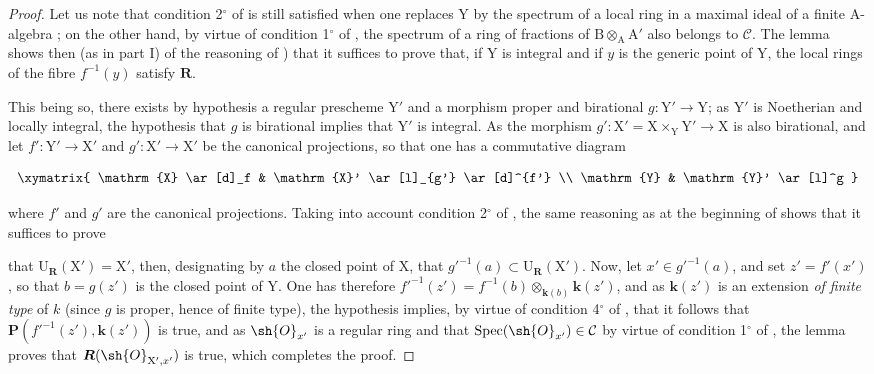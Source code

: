 \begin{proof}
Let us note that condition 2${}^\circ$ of  is still satisfied when one replaces $\mathrm{Y}$ by the spectrum of a local ring in a maximal ideal of a finite $\mathrm{A}$-algebra ; on the other hand, by virtue of condition 1${}^\circ$ of , the spectrum of a ring of fractions of $\mathrm{B}\otimes_\mathrm{A}\mathrm{A}'$ also belongs to $\mathcal{C}$. The lemma  shows then (as in part I) of the reasoning of ) that it suffices to prove that, if $\mathrm{Y}$ is integral and if $y$ is the generic point of $\mathrm{Y}$, the local rings of the fibre $f^{-1}(y)$ satisfy $\boldsymbol{R}$.

This being so, there exists by hypothesis a regular prescheme $\mathrm{Y}'$ and a morphism proper and birational $g:\mathrm{Y}'\to\mathrm{Y}$; as $\mathrm{Y}'$ is Noetherian and locally integral, the hypothesis that $g$ is birational implies that $\mathrm{Y}'$ is integral. As the morphism $g':\mathrm{X}'=\mathrm{X}\times_\mathrm{Y}\mathrm{Y}'\to\mathrm{X}$ is also birational, and let $f':\mathrm{Y}'\to\mathrm{X}'$ and $g':\mathrm{X}'\to\mathrm{X}'$ be the canonical projections, so that one has a commutative diagram

\begin{env}[7.9.8.1]
\label{IV.7.9.8.1}
\[
  \xymatrix{
    \mathrm{X} \ar[d]_f & \mathrm{X}' \ar[l]_{g'} \ar[d]^{f'} \\
    \mathrm{Y} & \mathrm{Y}' \ar[l]^g
  }
\]
\end{env}

where $f'$ and $g'$ are the canonical projections. Taking into account condition 2${}^\circ$ of , the same reasoning as at the beginning of  shows that it suffices to prove


that $\mathrm{U}_{\boldsymbol{R}}(\mathrm{X}')=\mathrm{X}'$, then, designating by $a$ the closed point of $\mathrm{X}$, that $g'^{-1}(a)\subset\mathrm{U}_{\boldsymbol{R}}(\mathrm{X}')$. Now, let $x'\in g'^{-1}(a)$, and set $z'=f'(x')$, so that $b=g(z')$ is the closed point of $\mathrm{Y}$. One has therefore $f'^{-1}(z')=f^{-1}(b)\otimes_{\boldsymbol{k}(b)}\boldsymbol{k}(z')$, and as $\boldsymbol{k}(z')$ is an extension \emph{of finite type} of $k$ (since $g$ is proper, hence of finite type), the hypothesis implies, by virtue of condition 4${}^\circ$ of , that it follows that $\boldsymbol{P}(f'^{-1}(z'),\boldsymbol{k}(z'))$ is true, and as $\sh{O}_{x'}$ is a regular ring and that $\operatorname{Spec}(\sh{O}_{x'})\in\mathcal{C}$ by virtue of condition 1${}^\circ$ of , the lemma  proves that $\boldsymbol{R}(\sh{O}_{\mathrm{X}',x'})$ is true, which completes the proof.
\end{proof}

